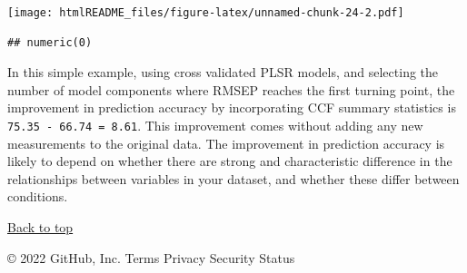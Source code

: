 \documentclass[
]{article}
\begin{document}
\texttt{[image: htmlREADME\_files/figure-latex/unnamed-chunk-24-2.pdf]}

\begin{verbatim}
## numeric(0)
\end{verbatim}

In this simple example, using cross validated PLSR models, and selecting
the number of model components where RMSEP reaches the first turning
point, the improvement in prediction accuracy by incorporating CCF
summary statistics is \texttt{75.35\ -\ 66.74\ =\ 8.61}. This
improvement comes without adding any new measurements to the original
data. The improvement in prediction accuracy is likely to depend on
whether there are strong and characteristic difference in the
relationships between variables in your dataset, and whether these
differ between conditions.

\protect\hyperlink{}{Back to top}

© 2022 GitHub, Inc. Terms Privacy Security Status
\end{document}
